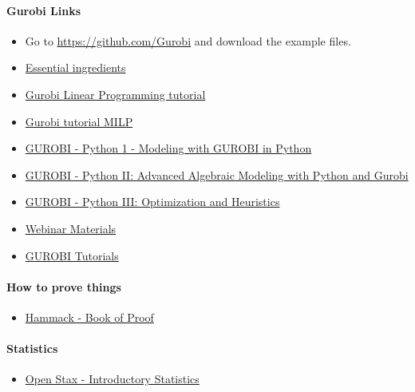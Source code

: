 \documentclass[letter,12pt]{book}
\renewcommand{\0}{\mathbf{0}}
\begin{document}
\paragraph{\textbf{Gurobi Links}}
\begin{itemize}
\item Go to \url{https://github.com/Gurobi} and download the example files.
\item \href{https://pages.gurobi.com/rs/181-ZYS-005/images/Management%20Paper_5%20Essential%20Ingredients%20for%20Optimization%20Success.pdf}{Essential ingredients}
\item \href{https://www.gurobi.com/resource/mathematical-programming-tutorial-linear-programming/}{Gurobi Linear Programming tutorial}
\item \href{https://www.gurobi.com/resource/tutorial-mixed-integer-linear-programming/}{Gurobi tutorial MILP}
\item \href{https://www.gurobi.com/resource/python-i-webinar/}{GUROBI - Python 1 - Modeling with GUROBI in Python}
\item \href{https://www.gurobi.com/resource/python-ii-webinar/}{GUROBI - Python II: Advanced Algebraic Modeling with Python and Gurobi}
\item \href{https://www.gurobi.com/resource/python-iii-webinar/}{GUROBI - Python III: Optimization and Heuristics}
\item \href{https://www.gurobi.com/wp-content/uploads/2018/12/python-3-webinar-materials.zip}{Webinar Materials}
\item \href{https://www.gurobi.com/resources/?category-filter=tutorials}{GUROBI Tutorials}
\end{itemize}

\paragraph{\textbf{How to prove things}}
\begin{itemize}
\item \href{https://open.umn.edu/opentextbooks/textbooks/book-of-proof}{Hammack - Book of Proof}
\end{itemize}

\paragraph{\textbf{Statistics}}
\begin{itemize}
\item\href{https://d3bxy9euw4e147.cloudfront.net/oscms-prodcms/media/documents/IntroductoryStatistics-OP_LXn0jei.pdf}{Open Stax - Introductory Statistics}
\end{itemize}
\end{document}
